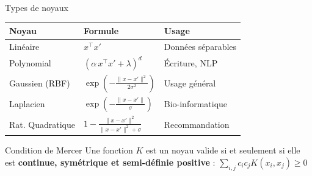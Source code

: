 \documentclass[11pt]{beamer}
\begin{document}
\begin{frame}{Types de noyaux}
    \small
    \begin{tabular}{|l|l|l|}
        \hline
        \textbf{Noyau} & \textbf{Formule} & \textbf{Usage} \\
        \hline
        Linéaire & $x^\top x'$ & Données séparables \\
        \hline
        Polynomial & $(\alpha\, x^\top x' + \lambda)^d$ & Écriture, NLP \\
        \hline
        Gaussien (RBF) & $\exp\!\left(-\frac{\|x-x'\|^2}{2\sigma^2}\right)$ & Usage général \\
        \hline
        Laplacien & $\exp\!\left(-\frac{\|x-x'\|}{\sigma}\right)$ & Bio-informatique \\
        \hline
        Rat. Quadratique & $1 - \frac{\|x-x'\|^2}{\|x-x'\|^2 + \sigma}$ & Recommandation \\
        \hline
    \end{tabular}

    \vspace{6pt}
    \begin{alertblock}{Condition de Mercer}\scriptsize
        Une fonction $K$ est un noyau valide si et seulement si elle est \textbf{continue, symétrique et semi-définie positive} :
        $\displaystyle\sum_{i,j} c_i c_j K(x_i, x_j) \geq 0$
    \end{alertblock}
\end{frame}
\end{document}
